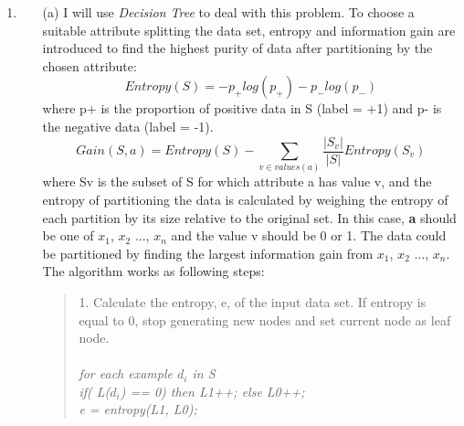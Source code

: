 
\usepackage{amsmath}
\usepackage{graphicx}
\usepackage{amsfonts}
\usepackage{amssymb}

\oddsidemargin 0in
\evensidemargin 0in
\textwidth 6.5in
\topmargin -0.5in
\textheight 9.0in




\pagestyle{myheadings}  %

\begin{enumerate}
\item 
\begin{itemize}  
 \item[(a)]  I will use \textit{Decision Tree} to deal with this problem. To choose a suitable attribute splitting the data set, entropy and information gain are introduced to find the highest purity of data after partitioning by the chosen attribute:
\begin{equation}
	Entropy(S) = -p_{+} log(p_{+}) - p_{-}log(p_{-})  
\end{equation}where p+ is the proportion of positive data in S (label = +1) and p- is the negative data (label = -1).  \begin{equation}
				Gain(S,a) = Entropy(S) - \sum_{v \in values(a)}  \frac{|S_{v}|}{|S| }Entropy(S_{v})
\end{equation}
where Sv is the subset of S for which attribute a has value v, and the entropy of partitioning the data is calculated by weighing the entropy of each partition by its size relative to the original set. In this case, \textbf{a} should be one of $x_1$, $x_2$ ..., $x_n$ and the value v should be 0 or 1. The data could be partitioned by finding the largest information gain from $x_1$, $x_2$ ..., $x_n$. The algorithm works as following steps:
 \begin{quote} 
1. Calculate the entropy, e, of the input data set. If entropy is equal to 0, stop generating new nodes and set current node as leaf node. \\\\
\hspace*{10pt} \textit{for each example $d_{i}$ in S}\\
\hspace*{20pt} \textit{if( L($d_{i}$) == 0) then L1++; else L0++;}\\
\hspace*{10pt} \textit{e = entropy(L1, L0);} \\

\end{quote}
\end{itemize}
\end{enumerate}
